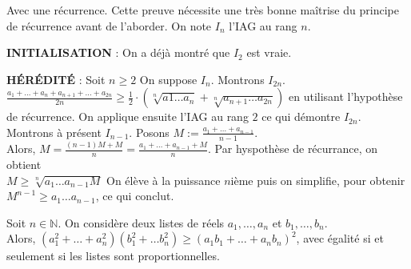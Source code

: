 \begin{preuve} Avec une récurrence. Cette preuve nécessite une très bonne maîtrise du principe de récurrence avant de l'aborder. On note $I_n$ l'IAG au rang $n$.

\textbf{INITIALISATION} : On a déjà montré que $I_2$ est vraie.

\textbf{HÉRÉDITÉ} : Soit $n\geqslant 2$ On suppose $I_n$. Montrons $I_{2n}$. \\ $\frac{a_1+ \dots + a_n + a_{n+1} + \dots + a_{2n}}{2n} \geqslant \frac{1}{2} \cdot (\sqrt[n]{a1\dots a_n} + \sqrt[n]{a_{n+1}\dots a_{2n}})$ en utilisant l'hypothèse de récurrence.
On applique ensuite l'IAG au rang $2$ ce qui démontre $I_{2n}$. \\ Montrons à présent $I_{n-1}$. Posons $M := \frac{a_1+\dots + a_{n-1}}{n-1}$. \\ Alors, $M = \frac{(n-1)M+M}{n} = \frac{a_1+\dots+a_{n-1} + M}{n}$. Par hyspothèse de récurrance, on obtient \\ $M \geqslant \sqrt[n]{a_1 \dots a_{n-1} M} $ On élève à la puissance $n$ième puis on simplifie, pour obtenir $M^{n-1} \geqslant a_1\dots a_{n-1}$, ce qui conclut.
\end{preuve}

\begin{pro} 
Soit $n \in \mathbb{N}$. On considère deux listes de réels $a_1, \dots, a_n$ et $b_1, \dots, b_n$. \\ Alors, $(a_1^2+\dots + a_n^2)(b_1^2+ \dots b_n^2) \geqslant (a_1b_1 + \dots + a_nb_n)^2$, avec égalité si et seulement si les listes sont proportionnelles.
\end{pro}

